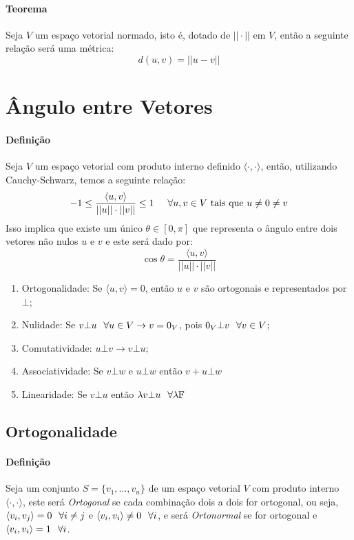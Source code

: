 \documentclass{article}
\begin{document}
            \paragraph{Teorema}Seja $V$ um espaço vetorial normado, isto é, dotado de $||\cdot||$ em $V$, então a seguinte relação será uma métrica:
                \[\boxed{d(u,v) = ||u-v||}\]
\newpage

    \section{Ângulo entre Vetores}
        \paragraph{Definição}Seja $V$ um espaço vetorial com produto interno definido $\langle\cdot,\cdot\rangle$, então, utilizando Cauchy-Schwarz, temos a seguinte relação:
            \[-1 \leq \frac{\langle u, v \rangle}{||u||\cdot||v||} \leq 1 \hspace{5mm} \forall u, v \in V \text{ tais que } u \neq 0 \neq v\]
        Isso implica que existe um único $\theta \in [0, \pi]$ que representa o ângulo entre dois vetores não nulos $u$ e $v$ e este será dado por:
            \[\boxed{\cos\theta = \frac{\langle u, v \rangle}{||u||\cdot||v||}}\]
            \begin{enumerate}[noitemsep]
                \item Ortogonalidade: Se $\langle u, v \rangle = 0$, então $u$ e $v$ são ortogonais e representados por $\bot$;
                \item Nulidade: Se $v\bot u \hspace{2.5mm} \forall u \in V \rightarrow v = 0_{V}$, pois $0_{V} \bot v \hspace{2.5mm} \forall v\in V$;
                \item Comutatividade: $u\bot v \rightarrow v\bot u$;
                \item Associatividade: Se $v\bot w$ e $u\bot w$ então $v + u\bot w$
                \item Linearidade: Se $v\bot u$ então $\lambda v\bot u \hspace{2.5mm} \forall\lambda\mathbb{F}$
            \end{enumerate}

        \subsection{Ortogonalidade}
            \paragraph{Definição}Seja um conjunto $S = \{v_{1},\dots,v_{n}\}$ de um espaço vetorial $V$ com produto interno $\langle\cdot,\cdot\rangle$, este será \textit{Ortogonal} se cada combinação dois a dois for ortogonal, ou seja, $\langle v_{i}, v_{j} \rangle = 0 \hspace{2.5mm} \forall i \neq j$ e $\langle v_{i}, v_{i} \rangle \neq 0 \hspace{2.5mm} \forall i$, e será \textit{Ortonormal} se for ortogonal e $\langle v_{i}, v_{i} \rangle = 1 \hspace{2.5mm} \forall i$.
\end{document}
